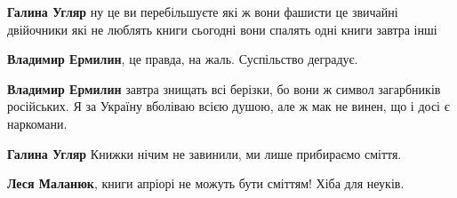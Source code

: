 \begin{itemize}
 
\textbf{Галина Угляр} ну це ви перебільшуєте які ж вони фашисти це звичайні двійочники які не люблять книги сьогодні вони спалять одні книги завтра інші

\begin{itemize}
 
\textbf{Владимир Ермилин}, це правда, на жаль. Суспільство деградує.

 
\textbf{Владимир Ермилин} завтра знищать всі берізки, бо вони ж символ загарбників російських. Я за Україну вболіваю всією душою, але ж мак не винен, що і досі є наркомани.
\end{itemize}

 
\textbf{Галина Угляр} Книжки нічим не завинили, ми лише прибираємо сміття.

\begin{itemize}
 
\textbf{Леся Маланюк}, книги апріорі не можуть бути сміттям! Хіба для неуків.
\end{itemize}

 

\end{itemize}
